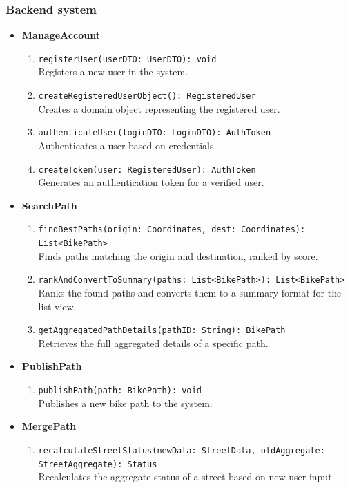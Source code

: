 \subsubsection{Backend system}
\begin{itemize}
    \item \textbf{ManageAccount}
        \begin{enumerate}
            \item \texttt{registerUser(userDTO: UserDTO): void} \\ Registers a new user in the system.
            \item \texttt{createRegisteredUserObject(): RegisteredUser} \\ Creates a domain object representing the registered user.
            \item \texttt{authenticateUser(loginDTO: LoginDTO): AuthToken} \\ Authenticates a user based on credentials.
            \item \texttt{createToken(user: RegisteredUser): AuthToken} \\ Generates an authentication token for a verified user.
        \end{enumerate}
    \item \textbf{SearchPath}
        \begin{enumerate}
            \item \texttt{findBestPaths(origin: Coordinates, dest: Coordinates): List<BikePath>} \\ Finds paths matching the origin and destination, ranked by score.
            \item \texttt{rankAndConvertToSummary(paths: List<BikePath>): List<BikePath>} \\ Ranks the found paths and converts them to a summary format for the list view.
            \item \texttt{getAggregatedPathDetails(pathID: String): BikePath} \\ Retrieves the full aggregated details of a specific path.
        \end{enumerate}
    \item \textbf{PublishPath}
        \begin{enumerate}
            \item \texttt{publishPath(path: BikePath): void} \\ Publishes a new bike path to the system.
        \end{enumerate}
    \item \textbf{MergePath}
        \begin{enumerate}
            \item \texttt{recalculateStreetStatus(newData: StreetData, oldAggregate: StreetAggregate): Status} \\ Recalculates the aggregate status of a street based on new user input.
        \end{enumerate}
\end{itemize}


